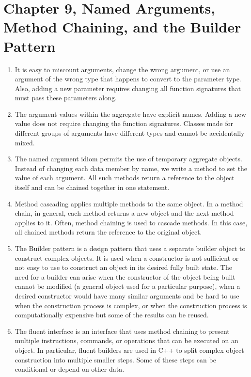 \section{Chapter 9, Named Arguments, Method Chaining, and the Builder Pattern}

\begin{enumerate}
\item
  It is easy to miscount arguments, change the wrong argument, or use an argument of the wrong type that happens to convert to the parameter type. Also, adding a new parameter requires changing all function signatures that must pass these parameters along.
\item
  The argument values within the aggregate have explicit names. Adding a new value does not require changing the function signatures. Classes made for different groups of arguments have different types and cannot be accidentally mixed.
\item
  The named argument idiom permits the use of temporary aggregate objects. Instead of changing each data member by name, we write a method to set the value of each argument. All such methods return a reference to the object itself and can be chained together in one statement.
\item
  Method cascading applies multiple methods to the same object. In a method chain, in general, each method returns a new object and the next method applies to it. Often, method chaining is used to cascade methods. In this case, all chained methods return the reference to the original object.
\item
  The Builder pattern is a design pattern that uses a separate builder object to construct complex objects. It is used when a constructor is not sufficient or not easy to use to construct an object in its desired fully built state. The need for a builder can arise when the constructor of the object being built cannot be modified (a general object used for a particular purpose), when a desired constructor would have many similar arguments and be hard to use when the construction process is complex, or when the construction process is computationally expensive but some of the results can be reused.
\item
  The fluent interface is an interface that uses method chaining to present multiple instructions, commands, or operations that can be executed on an object. In particular, fluent builders are used in C++ to split complex object construction into multiple smaller steps. Some of these steps can be conditional or depend on other data.
\end{enumerate}


